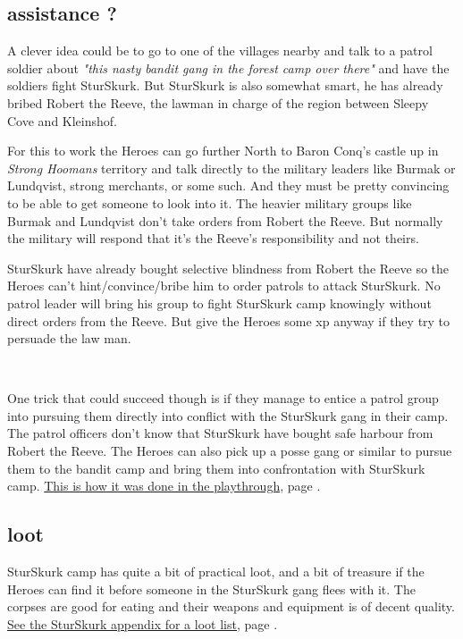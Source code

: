 \subsection*{assistance ?}

A clever idea could be to go to one of the villages nearby and talk to a patrol soldier about \emph{"this nasty bandit gang in the forest camp over there"} and have the soldiers fight SturSkurk. But SturSkurk is also somewhat smart, he has already bribed Robert the Reeve, the lawman in charge of the region between Sleepy Cove and Kleinshof.

For this to work the Heroes can go further North to Baron Conq's castle up in \emph{Strong Hoomans} territory and talk directly to the military leaders like Burmak or Lundqvist, strong merchants, or some such. And they must be pretty convincing to be able to get someone to look into it.
The heavier military groups like Burmak and Lundqvist don't take orders from Robert the Reeve. But normally the military will respond that it's the Reeve's responsibility and not theirs.

SturSkurk have already bought selective blindness from Robert the Reeve so the Heroes can't hint/convince/bribe him to order patrols to attack SturSkurk. No patrol leader will bring his group to fight SturSkurk camp knowingly without direct orders from the Reeve. But give the Heroes some xp anyway if they try to persuade the law man.

\

One trick that could succeed though is if they manage to entice a patrol group into pursuing them directly into conflict with the SturSkurk gang in their camp. The patrol officers don't know that SturSkurk have bought safe harbour from Robert the Reeve. The Heroes can also pick up a posse gang or similar to pursue them to the bandit camp and bring them into confrontation with SturSkurk camp. \hyperref[playthroughkillthebandits]{This is how it was done in the playthrough}, page \pageref{playthroughkillthebandits}.


\subsection*{loot}

SturSkurk camp has quite a bit of practical loot, and a bit of treasure if the Heroes can find it before someone in the SturSkurk gang flees with it. The corpses are good for eating and their weapons and equipment is of decent quality. 
\hyperref[appendixsturskurk]{See the SturSkurk appendix for a loot list}, page \pageref{appendixsturskurk}.


